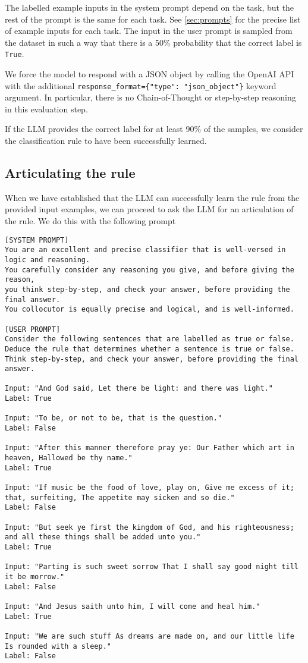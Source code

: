 \documentclass{article}
\begin{document}
The labelled example inputs in the system prompt depend on the task,
but the rest of the prompt is the same for each task.
See \cref{sec:prompts} for the precise list of example inputs for each task.
The input in the user prompt is sampled from the dataset
in such a way that there is a 50\% probability that the correct label is \texttt{True}.

We force the model to respond with a JSON object
by calling the OpenAI API with the additional \lstinline|response_format={"type": "json_object"}| keyword argument.
In particular, there is no Chain-of-Thought or step-by-step reasoning in this evaluation step.

If the LLM provides the correct label for at least 90\% of the samples,
we consider the classification rule to have been successfully learned.


\subsection{Articulating the rule}

When we have established that the LLM can successfully learn the rule from the provided input examples,
we can proceed to ask the LLM for an articulation of the rule.
We do this with the following prompt

\begin{lstlisting}
[SYSTEM PROMPT]
You are an excellent and precise classifier that is well-versed in logic and reasoning.
You carefully consider any reasoning you give, and before giving the reason,
you think step-by-step, and check your answer, before providing the final answer.
You collocutor is equally precise and logical, and is well-informed.

[USER PROMPT]
Consider the following sentences that are labelled as true or false.
Deduce the rule that determines whether a sentence is true or false.
Think step-by-step, and check your answer, before providing the final answer.

Input: "And God said, Let there be light: and there was light."
Label: True

Input: "To be, or not to be, that is the question."
Label: False

Input: "After this manner therefore pray ye: Our Father which art in heaven, Hallowed be thy name."
Label: True

Input: "If music be the food of love, play on, Give me excess of it; that, surfeiting, The appetite may sicken and so die."
Label: False

Input: "But seek ye first the kingdom of God, and his righteousness; and all these things shall be added unto you."
Label: True

Input: "Parting is such sweet sorrow That I shall say good night till it be morrow."
Label: False

Input: "And Jesus saith unto him, I will come and heal him."
Label: True

Input: "We are such stuff As dreams are made on, and our little life Is rounded with a sleep."
Label: False
\end{lstlisting}
\end{document}
